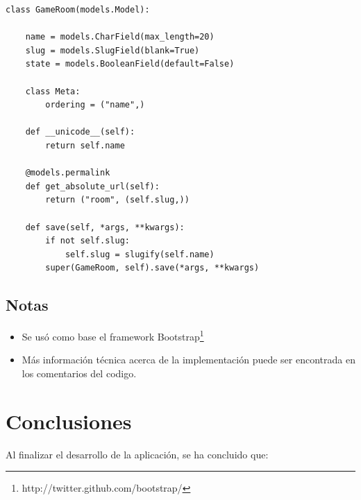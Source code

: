 \documentclass[a4paper,11pt]{article}
\begin{document}
\begin{lstlisting}[caption=cacho\_app/models.py]
class GameRoom(models.Model):

    name = models.CharField(max_length=20)
    slug = models.SlugField(blank=True)
    state = models.BooleanField(default=False) 

    class Meta:
        ordering = ("name",)

    def __unicode__(self):
        return self.name

    @models.permalink
    def get_absolute_url(self):
        return ("room", (self.slug,))

    def save(self, *args, **kwargs):
        if not self.slug:
            self.slug = slugify(self.name)
        super(GameRoom, self).save(*args, **kwargs)

\end{lstlisting}

\newpage

\subsection{Notas}
\begin{itemize}
	\item Se usó como base el framework Bootstrap\footnote{http://twitter.github.com/bootstrap/}
	\item Más información técnica acerca de la implementación puede ser encontrada en los comentarios del codigo.
\end{itemize}
\section{Conclusiones}

	Al finalizar el desarrollo de la aplicación, se ha concluido que:
\end{document}
